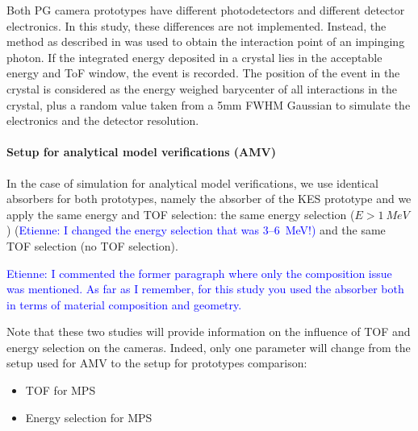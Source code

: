 \documentclass[a4paper,english]{article}
\newcommand{\tcb}[1]{\textcolor{blue}{#1}}
\begin{document}
Both PG camera prototypes have different photodetectors and different detector electronics. In this study, these differences are not implemented. Instead, the method as described in \cite{Gueth2013} was used to obtain the interaction point of an impinging photon. If the integrated energy deposited in a crystal lies in the acceptable energy and ToF window, the event is recorded. The position of the event in the crystal is considered as the energy weighed barycenter of all interactions in the crystal, plus a random value taken from a 5mm FWHM Gaussian to simulate the electronics and the detector resolution.

\paragraph{Setup for analytical model verifications (AMV)}


In the case of simulation for analytical model verifications, we use identical absorbers for both prototypes, namely the absorber of the KES prototype and we apply the same energy and TOF selection: the same energy selection ($E> 1~MeV$) (\tcb{Etienne: I changed the energy selection that was 3--6~MeV!)} and the same TOF selection (no TOF selection).

\tcb{Etienne: I commented the former paragraph where only the composition issue was mentioned. As far as I remember, for this study you used the absorber both in terms of material composition and geometry.}

Note that these two studies will provide information on the influence of TOF and energy selection on the cameras. Indeed, only one parameter will change from the setup used for AMV to the setup for prototypes comparison:
\begin{itemize}
	\item TOF for MPS
	\item Energy selection for MPS
\end{itemize}
\end{document}
